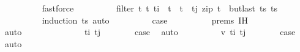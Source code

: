\begin{isabellebody}
\ \ \ \ \ \ \ \ \isamarkupfalse%
\ fastforce\isanewline
\ \ \ \ \ \ \isamarkupfalse%
\ \isamarkupfalse%
\ {\isachardoublequoteopen}filter\ {\isacharparenleft}{\kern0pt}{\isasymlambda}{\isacharparenleft}{\kern0pt}t{\isacharcomma}{\kern0pt}\ t{\isacharprime}{\kern0pt}{\isacharparenright}{\kern0pt}{\isachardot}{\kern0pt}\ t\isactrlsub i\ {\isasymle}\ t\ {\isasymand}\ t{\isacharprime}{\kern0pt}\ {\isasymle}\ t\isactrlsub j{\isacharparenright}{\kern0pt}\ {\isacharparenleft}{\kern0pt}zip\ {\isacharparenleft}{\kern0pt}t{\isacharprime}{\kern0pt}\ {\isacharhash}{\kern0pt}\ butlast\ ts{\isacharparenright}{\kern0pt}\ ts{\isacharparenright}{\kern0pt}\ {\isacharequal}{\kern0pt}\ {\isacharbrackleft}{\kern0pt}{\isacharbrackright}{\kern0pt}{\isachardoublequoteclose}\isanewline
\ \ \ \ \ \ \ \ \isamarkupfalse%
\ {\isacharparenleft}{\kern0pt}induction\ ts{\isacharparenright}{\kern0pt}\ auto\isanewline
\ \ \ \ \ \ \isamarkupfalse%
\ \isamarkupfalse%
\ {\isacharquery}{\kern0pt}case\isanewline
\ \ \ \ \ \ \ \ \isamarkupfalse%
\ {\isachardoublequoteopen}{}{\isachardot}{\kern0pt}prems{\isachardoublequoteclose}\ {\isachardoublequoteopen}{}{\isachardot}{\kern0pt}IH{\isachardoublequoteclose}\ \isanewline
\ \ \ \ \ \ \ \ \isamarkupfalse%
\ auto\isanewline
\ \ \ \ \isamarkupfalse%
\isanewline
\ \ \isamarkupfalse%
\isanewline
\ \ \ \ \isamarkupfalse%
\ {\isacharparenleft}{\kern0pt}{\isachardoublequoteopen}{}{\isacharunderscore}{\kern0pt}{}{\isachardoublequoteclose}\ t\isactrlsub i\ t\isactrlsub j{\isacharparenright}{\kern0pt}\isanewline
\ \ \ \ \isamarkupfalse%
\ \isamarkupfalse%
\ {\isacharquery}{\kern0pt}case\ \isamarkupfalse%
\ auto\isanewline
\ \ \isamarkupfalse%
\isanewline
\ \ \ \ \isamarkupfalse%
\ {\isacharparenleft}{\kern0pt}{\isachardoublequoteopen}{}{\isacharunderscore}{\kern0pt}{}{\isachardoublequoteclose}\ v\ t\isactrlsub i\ t\isactrlsub j{\isacharparenright}{\kern0pt}\isanewline
\ \ \ \ \isamarkupfalse%
\ \isamarkupfalse%
\ {\isacharquery}{\kern0pt}case\ \isamarkupfalse%
\ auto\isanewline
\ \ \isamarkupfalse%
%
\endisatagproof
{\isafoldproof}%
%
\isadelimproof
\isanewline
%
\endisadelimproof
\isanewline
\ \ \isamarkupfalse%

\end{isabellebody}
